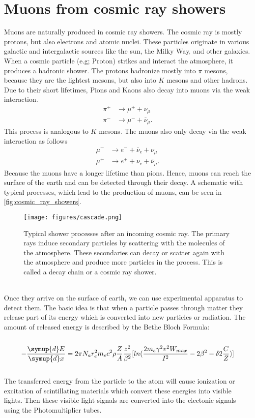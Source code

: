 \section{Muons from cosmic ray showers} 
Muons are naturally produced in cosmic ray showers.
The cosmic ray is mostly protons, but also electrons and atomic nuclei.
These particles originate in various galactic and intergalactic sources like the sun, the Milky Way, and other galaxies.
When a cosmic particle (e.g; Proton) strikes and interact the atmosphere, it produces a hadronic shower.
The protons hadronize mostly into $\pi$ mesons, because they are the lightest mesons, but also into $K$ mesons and other hadrons.
Due to their short lifetimes, Pions and Kaons also decay into muons via the weak interaction. 
\begin{align*}
    \pi^{+} &\to \mu^{+} + \nu_{\mu} \\
    \pi^{-} &\to \mu^{-} + \bar{\nu}_{\mu}.
\end{align*}
This process is analogous to $K$ mesons.
The muons also only decay via the weak interaction as follows 
\begin{align*}
    \mu^{-} &\to e^{-} + \bar{\nu}_{e} + {\nu}_{\mu} \\
    \mu^{+} &\to e^{+} + \nu_{e} + \bar{\nu}_{\mu}.
\end{align*}
Because the muons have a longer lifetime than pions. Hence, muons can reach the surface of the earth and can be detected through their decay. 
A schematic with typical processes, which lead to the production of muons, can be seen in \autoref{fig:cosmic_ray_showers}.
\begin{figure}
    \centering
    \texttt{[image: figures/cascade.png]}
    \caption{Typical shower processes after an incoming cosmic ray. The primary rays induce secondary particles by scattering with the 
    molecules of the atmosphere. These secondaries can decay or scatter again with the atmosphere and produce more particles in the process. 
    This is called a decay chain or a cosmic ray shower\cite{nasa}.}
    \label{fig:cosmic_ray_showers}
\end{figure}
\\
Once they arrive on the surface of earth, we can use experimental apparatus to detect them.
The basic idea is that when a particle passes through matter they release part of its energy which is converted into new particles or radiation.
The amount of released energy is described by the Bethe Bloch Formula:\\\\
\begin{equation*}
-\frac {\symup{d}E}{\symup{d}x} = 2 \pi N_a r_{e}^{2}m_{e}c^{2}\rho \frac{Z}{A} \frac {z^{2}}{\beta^{2}} [ ln(\frac{2m_{e} \gamma^{2} v^{2} W_{max}}{I^{2}}  - 2 \beta^{2} - \delta 2 \frac {C}{Z})]
\end{equation*}
\\
The transferred energy from the particle to the atom will cause ionization or excitation of scintillating materials which convert these energies into visible lights. Then these visible light signals are converted into the electonic signals using the Photomultiplier tubes.
